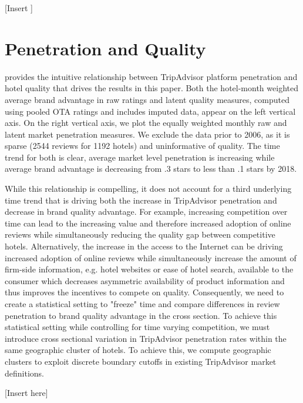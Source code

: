 \documentclass[mksc,blindrev]{informs3} %
\begin{document}
[Insert ]


\section{Penetration and Quality} \label{sec:mainstudy}

 provides the intuitive relationship between TripAdvisor platform penetration and hotel quality that drives the results in this paper. Both the hotel-month weighted average brand advantage in raw ratings and latent quality measures, computed using pooled OTA ratings and includes imputed data, appear on the left vertical axis. On the right vertical axis, we plot the equally weighted monthly raw and latent market penetration measures. We exclude the data prior to 2006, as it is sparse (2544 reviews for 1192 hotels) and uninformative of quality. The time trend for both is clear, average market level penetration is increasing while average brand advantage is decreasing from .3 stars to less than .1 stars by 2018. 

While this relationship is compelling, it does not account for a third underlying time trend that is driving both the increase in TripAdvisor penetration and decrease in brand quality advantage. For example, increasing competition over time can lead to the increasing value and therefore increased adoption of online reviews while simultaneously reducing the quality gap between competitive hotels. Alternatively, the increase in the access to the Internet can be driving increased adoption of online reviews while simultaneously increase the amount of firm-side information, e.g. hotel websites or ease of hotel search, available to the consumer which decreases asymmetric availability of product information and thus improves the incentives to compete on quality. Consequently, we need to create a statistical setting to "freeze" time and compare differences in review penetration to brand quality advantage in the cross section. To achieve this statistical setting while controlling for time varying competition, we must introduce cross sectional variation in TripAdvisor penetration rates within the same geographic cluster of hotels. To achieve this, we compute geographic clusters to exploit discrete boundary cutoffs in existing TripAdvisor market definitions. 

[Insert  here]
\end{document}
